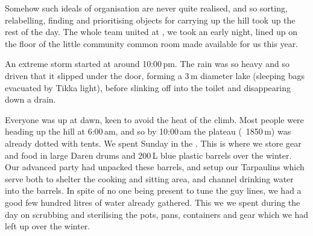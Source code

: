 Somehow such ideals of organisation are never quite realised, and so sorting, relabelling, finding and prioritising objects for carrying up the hill took up the rest of the day. The whole team united at , we took an early night, lined up on the floor of the little community common room made available for us this year. 

An extreme storm started at around 10:00\,pm. The rain was so heavy and so driven that it slipped under the door, forming a 3\,m diameter lake (sleeping bags evacuated by Tikka light), before slinking off into the toilet and disappearing down a drain.

Everyone was up at dawn, keen to avoid the heat of the climb. Most people were heading up the hill at 6:00\,am, and so by 10:00\,am the plateau (~1850\,m) was already dotted with tents. We spent Sunday in the . This is where we store gear and food in large Daren drums and 200\,L blue plastic barrels over the winter. Our advanced party had unpacked these barrels, and setup our Tarpaulins which serve both to shelter the cooking and sitting area, and channel drinking water into the barrels. In spite of no one being present to tune the guy lines, we had a good few hundred litres of water already gathered. This we we spent during the day on scrubbing and sterilising the pots, pans, containers and gear which we had left up over the winter. 

